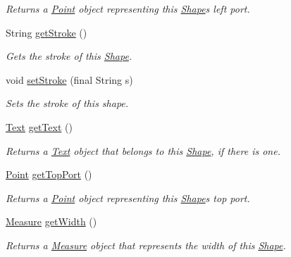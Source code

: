 \begin{DoxyCompactItemize}
\begin{DoxyCompactList}\small\item\em Returns a \hyperlink{classcom_1_1aarrelaakso_1_1drawl_1_1_point}{Point} object representing this \hyperlink{classcom_1_1aarrelaakso_1_1drawl_1_1_shape}{Shape}\textquotesingle{}s left port. \end{DoxyCompactList}\item 
String \hyperlink{classcom_1_1aarrelaakso_1_1drawl_1_1_shape_a4e1d54c7e161e3af5053939ddefdf9e6}{get\+Stroke} ()
\begin{DoxyCompactList}\small\item\em Gets the stroke of this \hyperlink{classcom_1_1aarrelaakso_1_1drawl_1_1_shape}{Shape}. \end{DoxyCompactList}\item 
void \hyperlink{classcom_1_1aarrelaakso_1_1drawl_1_1_shape_a75685cbfea36858836df8e1fb4f8b821}{set\+Stroke} (final String s)
\begin{DoxyCompactList}\small\item\em Sets the stroke of this shape. \end{DoxyCompactList}\item 
\hyperlink{classcom_1_1aarrelaakso_1_1drawl_1_1_text}{Text} \hyperlink{classcom_1_1aarrelaakso_1_1drawl_1_1_shape_a6f876978d4102974fedc5b41c93c7b26}{get\+Text} ()
\begin{DoxyCompactList}\small\item\em Returns a \hyperlink{classcom_1_1aarrelaakso_1_1drawl_1_1_text}{Text} object that belongs to this \hyperlink{classcom_1_1aarrelaakso_1_1drawl_1_1_shape}{Shape}, if there is one. \end{DoxyCompactList}\item 
\hyperlink{classcom_1_1aarrelaakso_1_1drawl_1_1_point}{Point} \hyperlink{classcom_1_1aarrelaakso_1_1drawl_1_1_shape_aed4e9caa294aacc973b7a531a960e9e5}{get\+Top\+Port} ()
\begin{DoxyCompactList}\small\item\em Returns a \hyperlink{classcom_1_1aarrelaakso_1_1drawl_1_1_point}{Point} object representing this \hyperlink{classcom_1_1aarrelaakso_1_1drawl_1_1_shape}{Shape}\textquotesingle{}s top port. \end{DoxyCompactList}\item 
\hyperlink{classcom_1_1aarrelaakso_1_1drawl_1_1_measure}{Measure} \hyperlink{classcom_1_1aarrelaakso_1_1drawl_1_1_shape_a3e2c58984f1bcbc2e9e86cf30868561e}{get\+Width} ()
\begin{DoxyCompactList}\small\item\em Returns a \hyperlink{classcom_1_1aarrelaakso_1_1drawl_1_1_measure}{Measure} object that represents the width of this \hyperlink{classcom_1_1aarrelaakso_1_1drawl_1_1_shape}{Shape}. \end{DoxyCompactList}\item 

\end{DoxyCompactItemize}
